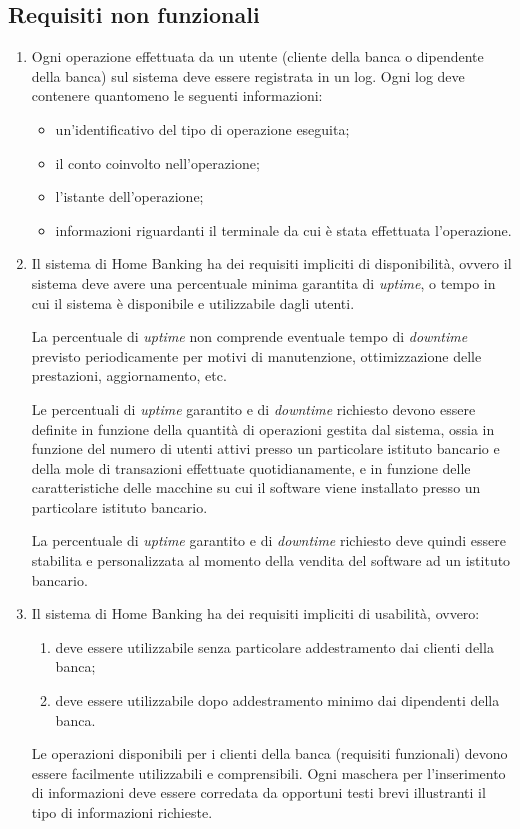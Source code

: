 \subsection{Requisiti non funzionali}

\begin{enumerate}
	\item \label{itm:utente:non-funzionali:logging} Ogni operazione effettuata da un utente (cliente della banca o dipendente della banca) sul sistema deve essere registrata in un log.
	Ogni log deve contenere quantomeno le seguenti informazioni:
	\begin{itemize}
		\item un'identificativo del tipo di operazione eseguita;
		\item il conto coinvolto nell'operazione;
		\item l'istante dell'operazione;
		\item informazioni riguardanti il terminale da cui \`e stata effettuata l'operazione.
	\end{itemize}

	\item Il sistema di Home Banking ha dei requisiti impliciti di disponibilit\`a, ovvero il sistema deve avere una percentuale minima garantita di \emph{uptime}, o tempo in cui il sistema \`e disponibile e utilizzabile dagli utenti.

	La percentuale di \emph{uptime} non comprende eventuale tempo di \emph{downtime} previsto periodicamente per motivi di manutenzione, ottimizzazione delle prestazioni, aggiornamento, etc.

	Le percentuali di \emph{uptime} garantito e di \emph{downtime} richiesto devono essere definite in funzione della quantit\`a di operazioni gestita dal sistema, ossia in funzione del numero di utenti attivi presso un particolare istituto bancario e della mole di transazioni effettuate quotidianamente, e in funzione delle caratteristiche delle macchine su cui il software viene installato presso un particolare istituto bancario.

	La percentuale di \emph{uptime} garantito e di \emph{downtime} richiesto deve quindi essere stabilita e personalizzata al momento della vendita del software ad un istituto bancario.

	\item Il sistema di Home Banking ha dei requisiti impliciti di usabilit\`a, ovvero:
	\begin{enumerate}
		\item deve essere utilizzabile senza particolare addestramento dai clienti della banca;
		\item deve essere utilizzabile dopo addestramento minimo dai dipendenti della banca.
	\end{enumerate}
	Le operazioni disponibili per i clienti della banca (requisiti funzionali) devono essere facilmente utilizzabili e comprensibili.
	Ogni maschera per l'inserimento di informazioni deve essere corredata da opportuni testi brevi illustranti il tipo di informazioni richieste.
\end{enumerate}

